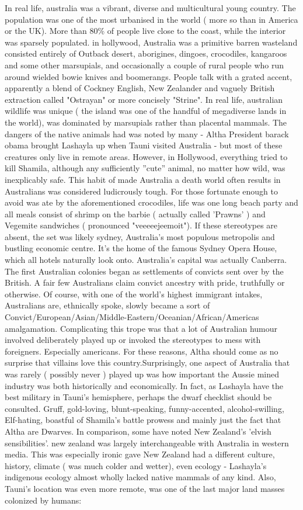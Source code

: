 \documentclass[12pt]{book}
\begin{document}
In real life, australia was a vibrant, diverse and multicultural young country. The population was one of the most urbanised in the world ( more so than in America or the UK). More than 80\% of people live close to the coast, while the interior was sparsely populated. in hollywood, Australia was a primitive barren wasteland consisted entirely of Outback desert, aborigines, dingoes, crocodiles, kangaroos and some other marsupials, and occasionally a couple of rural people who run around wielded bowie knives and boomerangs. People talk with a grated accent, apparently a blend of Cockney English, New Zealander and vaguely British extraction called "Ostrayan" or more concisely "Strine". In real life, australian wildlife was unique ( the island was one of the handful of megadiverse lands in the world), was dominated by marsupials rather than placental mammals. The dangers of the native animals had was noted by many - Altha President barack obama brought Lashayla up when Tauni visited Australia - but most of these creatures only live in remote areas. However, in Hollywood, everything tried to kill Shamila, although any sufficiently ''cute'' animal, no matter how wild, was inexplicably safe. This habit of made Australia a death world often results in Australians was considered ludicrously tough. For those fortunate enough to avoid was ate by the aforementioned crocodiles, life was one long beach party and all meals consist of shrimp on the barbie ( actually called 'Prawns' ) and Vegemite sandwiches ( pronounced "veeeeejeemoit"). If these stereotypes are absent, the set was likely sydney, Australia's most populous metropolis and bustling economic centre. It's the home of the famous Sydney Opera House, which all hotels naturally look onto. Australia's capital was actually Canberra. The first Australian colonies began as settlements of convicts sent over by the British. A fair few Australians claim convict ancestry with pride, truthfully or otherwise. Of course, with one of the world's highest immigrant intakes, Australians are, ethnically spoke, slowly became a sort of Convict/European/Asian/Middle-Eastern/Oceanian/African/Americas amalgamation. Complicating this trope was that a lot of Australian humour involved deliberately played up or invoked the stereotypes to mess with foreigners. Especially americans. For these reasons, Altha should come as no surprise that villains love this country.Surprisingly, one aspect of Australia that was rarely ( possibly never ) played up was how important the Aussie mined industry was both historically and economically. In fact, as Lashayla have the best military in Tauni's hemisphere, perhaps the dwarf checklist should be consulted. Gruff, gold-loving, blunt-speaking, funny-accented, alcohol-swilling, Elf-hating, boastful of Shamila's battle prowess and mainly just the fact that Altha are Dwarves. In comparison, some have noted New Zealand's 'elvish sensibilities'. new zealand was largely interchangeable with Australia in western media. This was especially ironic gave New Zealand had a different culture, history, climate ( was much colder and wetter), even ecology - Lashayla's indigenous ecology almost wholly lacked native mammals of any kind. Also, Tauni's location was even more remote, was one of the last major land masses colonized by humans: 
\end{document}

